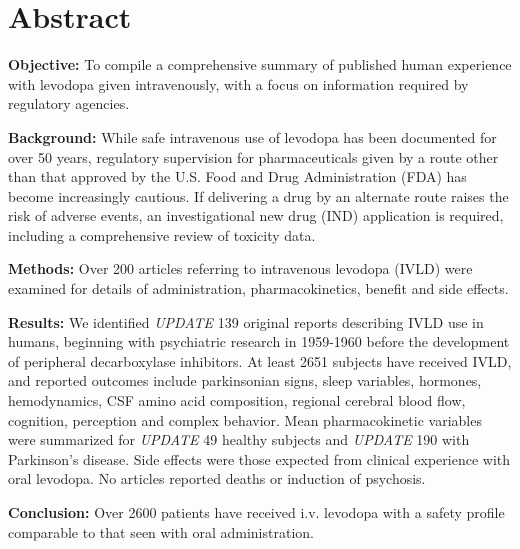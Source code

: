 \section{Abstract}
\textbf{Objective:} To compile a comprehensive summary of published human experience with levodopa given intravenously, with a focus on information required by regulatory agencies.

\textbf{Background:} While safe intravenous use of levodopa has been documented for over 50 years, regulatory supervision for pharmaceuticals given by a route other than that approved by the U.S. Food and Drug Administration (FDA) has become increasingly cautious. If delivering a drug by an alternate route raises the risk of adverse events, an investigational new drug (IND) application is required, including a comprehensive review of toxicity data.

\textbf{Methods:} Over 200 articles referring to intravenous levodopa (IVLD) were examined for details of administration, pharmacokinetics, benefit and side effects.

\textbf{Results:} We identified \textit{UPDATE} 139 original reports describing IVLD use in humans, beginning with psychiatric research in 1959-1960 before the development of peripheral decarboxylase inhibitors. At least 2651 subjects have received IVLD, and reported outcomes include parkinsonian signs, sleep variables, hormones, hemodynamics, CSF amino acid composition, regional cerebral blood ﬂow, cognition, perception and complex behavior. Mean pharmacokinetic variables were summarized for \textit{UPDATE} 49 healthy subjects and \textit{UPDATE} 190 with Parkinson's disease. Side effects were those expected from clinical experience with oral levodopa. No articles reported deaths or induction of psychosis.

\textbf{Conclusion:} Over 2600 patients have received i.v. levodopa with a safety profile comparable to that seen with oral administration.